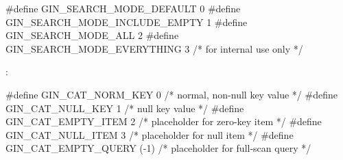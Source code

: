 \begin{ccode}
#define GIN_SEARCH_MODE_DEFAULT         0
#define GIN_SEARCH_MODE_INCLUDE_EMPTY   1
#define GIN_SEARCH_MODE_ALL             2
#define GIN_SEARCH_MODE_EVERYTHING      3   /* for internal use only */
\end{ccode}

:

\begin{ccode}
#define GIN_CAT_NORM_KEY        0   /* normal, non-null key value */
#define GIN_CAT_NULL_KEY        1   /* null key value */
#define GIN_CAT_EMPTY_ITEM      2   /* placeholder for zero-key item */
#define GIN_CAT_NULL_ITEM       3   /* placeholder for null item */
#define GIN_CAT_EMPTY_QUERY     (-1)    /* placeholder for full-scan query */
\end{ccode}

